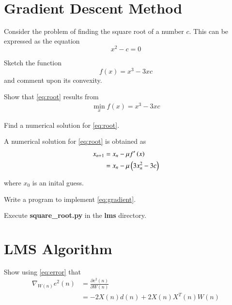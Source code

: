 \documentclass[journal,12pt,twocolumn]{IEEEtran}
\begin{document}
\section{Gradient Descent Method}
Consider the problem of finding the square root of a number $c$.  This can be expressed as the equation
%
\begin{equation}
\label{eq:root}
x^2 -c= 0
\end{equation}
%
\begin{problem}
Sketch the function 
%
\begin{equation}
f(x)= x^{3}-3xc
\end{equation}
%
and comment upon its convexity.
\end{problem}
\begin{problem}
Show that \eqref{eq:root} results from
\begin{align}
\min_{x}f(x)= x^{3}-3xc
\end{align}
\end{problem}
\begin{problem}
Find a numerical solution for \eqref{eq:root}.
\end{problem}
\solution
A numerical solution for \eqref{eq:root} is obtained as
%
\begin{align}
x_{n+1}&=x_{n}-\mu f^{\prime}\left(x\right)
\\
&=x_{n} -\mu \left(3x_n^{2}-3c\right)
\label{eq:gradient}
\end{align}

%
where $x_0$ is an inital guess.
%
\begin{problem}
Write a program to implement \eqref{eq:gradient}.
\end{problem}
%
\solution 
Execute \textbf{square\_root.py} in the \textbf{lms} directory.
%
\section{LMS Algorithm}
%
\begin{problem}
Show using \eqref{eq:error}  that 
\begin{align}
\nabla_{W(n)}e^2(n)&=\frac{\partial e^{2}(n)}{\partial W(n)}\\
&=- 2X(n)d(n) + 2 X(n) X^{T}(n)W(n)
\end{align}
%
\end{problem}
\end{document}

